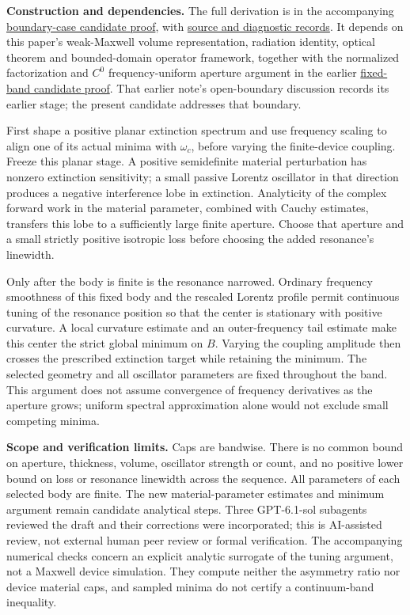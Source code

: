 \documentclass[11pt]{article}
\begin{document}
\noindent\textbf{Construction and dependencies.}
The full derivation is in the accompanying \href{https://dan-k391.github.io/oq7-papers/prescribed-extinction/boundary-candidate.pdf}{boundary-case candidate proof}, with \href{https://dan-k391.github.io/oq7-papers/prescribed-extinction/boundary-candidate-source.zip}{source and diagnostic records}. It depends on this paper's weak-Maxwell volume representation, radiation identity, optical theorem and bounded-domain operator framework, together with the normalized factorization and $C^0$ frequency-uniform aperture argument in the earlier \href{https://dan-k391.github.io/oq7-papers/prescribed-extinction/fixed-band-candidate.pdf}{fixed-band candidate proof}. That earlier note's open-boundary discussion records its earlier stage; the present candidate addresses that boundary.

First shape a positive planar extinction spectrum and use frequency scaling to align one of its actual minima with $\omega_c$, before varying the finite-device coupling. Freeze this planar stage. A positive semidefinite material perturbation has nonzero extinction sensitivity; a small passive Lorentz oscillator in that direction produces a negative interference lobe in extinction. Analyticity of the complex forward work in the material parameter, combined with Cauchy estimates, transfers this lobe to a sufficiently large finite aperture. Choose that aperture and a small strictly positive isotropic loss before choosing the added resonance's linewidth.

Only after the body is finite is the resonance narrowed. Ordinary frequency smoothness of this fixed body and the rescaled Lorentz profile permit continuous tuning of the resonance position so that the center is stationary with positive curvature. A local curvature estimate and an outer-frequency tail estimate make this center the strict global minimum on $B$. Varying the coupling amplitude then crosses the prescribed extinction target while retaining the minimum. The selected geometry and all oscillator parameters are fixed throughout the band. This argument does not assume convergence of frequency derivatives as the aperture grows; uniform spectral approximation alone would not exclude small competing minima.

\noindent\textbf{Scope and verification limits.}
Caps are bandwise. There is no common bound on aperture, thickness, volume, oscillator strength or count, and no positive lower bound on loss or resonance linewidth across the sequence. All parameters of each selected body are finite. The new material-parameter estimates and minimum argument remain candidate analytical steps. Three GPT-6.1-sol subagents reviewed the draft and their corrections were incorporated; this is AI-assisted review, not external human peer review or formal verification. The accompanying numerical checks concern an explicit analytic surrogate of the tuning argument, not a Maxwell device simulation. They compute neither the asymmetry ratio nor device material caps, and sampled minima do not certify a continuum-band inequality.
\end{document}
